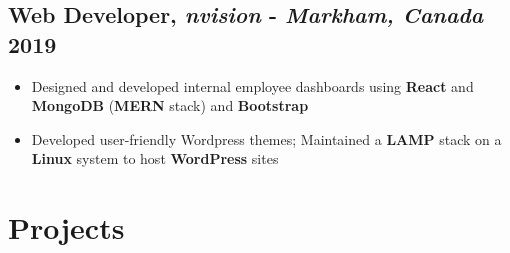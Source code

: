\documentclass[9pt]{article}
\begin{document}
\subsection{Web Developer, \textit{nvision} - \normalsize\textit{Markham, Canada} \hfill \normalsize\textnormal{2019}}
\begin{itemize}
  \item Designed and developed internal employee dashboards using \textbf{React} and \textbf{MongoDB} (\textbf{MERN} stack) and \textbf{Bootstrap} 
  \item Developed user-friendly Wordpress themes; Maintained a \textbf{LAMP} stack on a \textbf{Linux} system to host \textbf{WordPress} sites
\end{itemize}




\section*{Projects}
\end{document}
